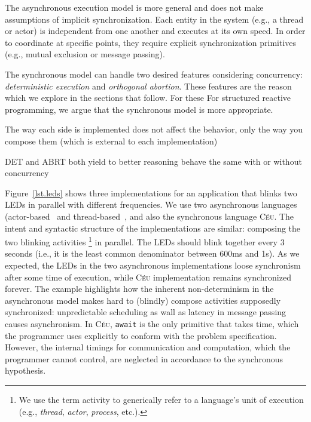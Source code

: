 \documentclass{acm_proc_article-sp}
\newcommand{\CEU}{\textsc{C\'{e}u}\xspace}
\newcommand{\code}[1] {{\small{\texttt{#1}}}}
\newcommand{\1}{\;}
\newcommand{\2}{\;\;}
\newcommand{\3}{\;\;\;}
\newcommand{\5}{\;\;\;\;\;}
\begin{document}
The asynchronous execution model is more general and does not make assumptions 
of implicit synchronization.
Each entity in the system (e.g., a thread or actor) is independent from one 
another and executes at its own speed.
In order to coordinate at specific points, they require explicit 
synchronization primitives (e.g., mutual exclusion or message passing).


The synchronous model can handle two desired features considering concurrency: 
\emph{deterministic execution} and \emph{orthogonal abortion}.
%
These features are the reason
which we explore in the sections that follow.
For these
For structured reactive programming, we argue that the synchronous model is 
more appropriate.

The way each side is implemented does not affect the behavior,
only the way you compose them (which is external to each implementation)

%
DET and ABRT
both yield to better reasoning
behave the same with or without concurrency


Figure~\ref{lst.leds} shows three implementations for an application that 
blinks two LEDs in parallel with different frequencies.
We use two asynchronous languages (actor-based~\cite{arduino.occam} and 
thread-based~\cite{arduino.chibios}, and also the synchronous language \CEU.
%
The intent and syntactic structure of the implementations are similar:
composing the two blinking activities%
\footnote{We use the term activity to generically refer to a language's unit of 
execution (e.g., \emph{thread}, \emph{actor}, \emph{process}, etc.).}
in parallel.
%
The LEDs should blink together every 3 seconds (i.e., it is the least common 
denominator between 600ms and 1s).
%
As we expected, the LEDs in the two asynchronous implementations loose 
synchronism after some time of execution, while \CEU implementation remains 
synchronized forever.
%
The example highlights how the inherent non-determinism in the asynchronous 
model makes hard to (blindly) compose activities supposedly synchronized: 
unpredictable scheduling as wall as latency in message passing causes 
asynchronism.
%
In \CEU, \code{await} is the only primitive that takes time, which the 
programmer uses explicitly to conform with the problem specification.
However, the internal timings for communication and computation, which the 
programmer cannot control, are neglected in accordance to the synchronous 
hypothesis.
\end{document}
